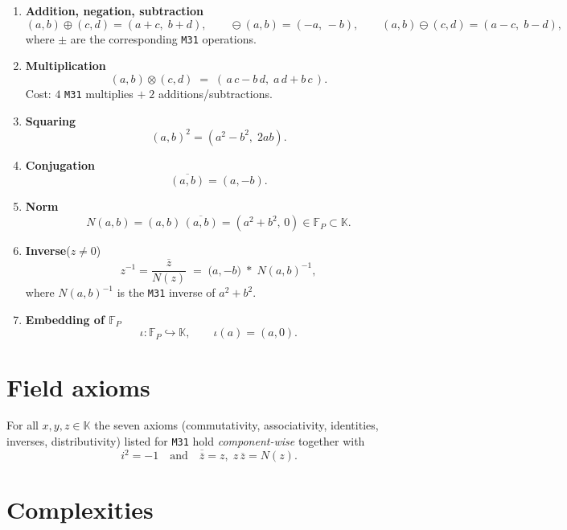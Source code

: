 \documentclass{article}
\begin{document}
\begin{enumerate}[label=\textbf{O\arabic*}.]
\item \textbf{Addition, negation, subtraction}
      \[
        (a,b) \oplus (c,d) = (a\!+\!c,\; b\!+\!d),
        \qquad
        \ominus(a,b) = (-a,\,-b),
        \qquad
        (a,b)\ominus(c,d)=(a\!-c,\;b\!-d),
      \]
      where \(\pm\) are the corresponding \texttt{M31} operations.

\item \textbf{Multiplication}
      \[
        (a,b)\otimes(c,d)
        \;=\;
        (\,a\,c - b\,d,\; a\,d + b\,c\,).
        \tag{$*$}
      \]
      Cost: \(4\) \texttt{M31} multiplies \(+\;2\) additions/subtractions.

\item \textbf{Squaring}
      \[
        (a,b)^{2} = (a^{2}-b^{2},\;2ab).
      \]

\item \textbf{Conjugation}
      \[
        \overline{(a,b)} = (a,-b).
      \]

\item \textbf{Norm}
      \[
        N(a,b) = (a,b)\,\overline{(a,b)}
                = (a^{2}+b^{2},\,0)\in\mathbb{F}_{P}\subset\mathbb{K}.
      \]

\item \textbf{Inverse}\;(\(z\neq0\))
      \[
        z^{-1} = \dfrac{\overline{z}}{N(z)}
               \;=\;
        \bigl(a,-b\bigr)\;*\;N(a,b)^{-1},
      \]
      where \(N(a,b)^{-1}\) is the \texttt{M31} inverse of \(a^{2}+b^{2}\).

\item \textbf{Embedding of \(\mathbb{F}_{P}\)}
      \[
         \iota\colon\mathbb{F}_{P}\hookrightarrow\mathbb{K},
         \qquad
         \iota(a)=(a,0).
      \]
\end{enumerate}

\section{Field axioms}

For all \(x,y,z\in\mathbb{K}\) the seven axioms (commutativity,
associativity, identities, inverses, distributivity)
listed for \texttt{M31} hold \emph{component-wise} together with
\[
   i^{2} = -1
   \quad\text{and}\quad
   \overline{\overline{z}}=z,\;
   z\,\overline{z}=N(z).
\]

\section{Complexities}
\end{document}
